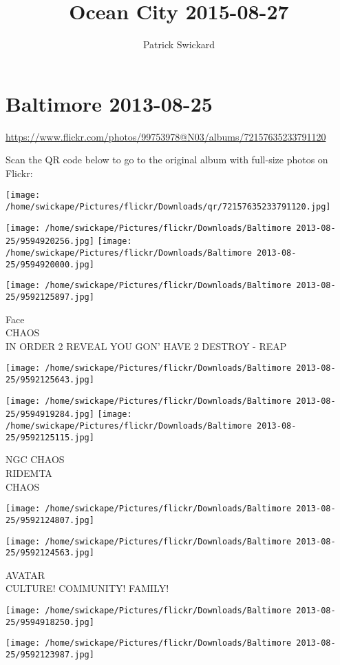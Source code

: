 \documentclass[10pt,letterpaper]{article}
\title{Ocean City 2015-08-27}
\author{Patrick Swickard}
\date{}
\begin{document}
\section*{Baltimore 2013-08-25}

\url{https://www.flickr.com/photos/99753978@N03/albums/72157635233791120}

Scan the QR code below to go to the original album with full-size photos on Flickr:

\texttt{[image: /home/swickape/Pictures/flickr/Downloads/qr/72157635233791120.jpg]}
\pagebreak

\texttt{[image: /home/swickape/Pictures/flickr/Downloads/Baltimore 2013-08-25/9594920256.jpg]}
\texttt{[image: /home/swickape/Pictures/flickr/Downloads/Baltimore 2013-08-25/9594920000.jpg]}

\texttt{[image: /home/swickape/Pictures/flickr/Downloads/Baltimore 2013-08-25/9592125897.jpg]}

Face\\
CHAOS\\
IN ORDER 2 REVEAL YOU GON' HAVE 2 DESTROY {-} REAP
\pagebreak

\texttt{[image: /home/swickape/Pictures/flickr/Downloads/Baltimore 2013-08-25/9592125643.jpg]}

\vspace{0.25in}
\texttt{[image: /home/swickape/Pictures/flickr/Downloads/Baltimore 2013-08-25/9594919284.jpg]}
\texttt{[image: /home/swickape/Pictures/flickr/Downloads/Baltimore 2013-08-25/9592125115.jpg]}

NGC CHAOS\\
RIDEMTA\\
CHAOS
\pagebreak

\texttt{[image: /home/swickape/Pictures/flickr/Downloads/Baltimore 2013-08-25/9592124807.jpg]}

\vspace{0.25in}
\texttt{[image: /home/swickape/Pictures/flickr/Downloads/Baltimore 2013-08-25/9592124563.jpg]}

AVATAR\\
CULTURE! COMMUNITY! FAMILY!
\pagebreak

\texttt{[image: /home/swickape/Pictures/flickr/Downloads/Baltimore 2013-08-25/9594918250.jpg]}

\vspace{0.25in}
\texttt{[image: /home/swickape/Pictures/flickr/Downloads/Baltimore 2013-08-25/9592123987.jpg]}
\end{document}
